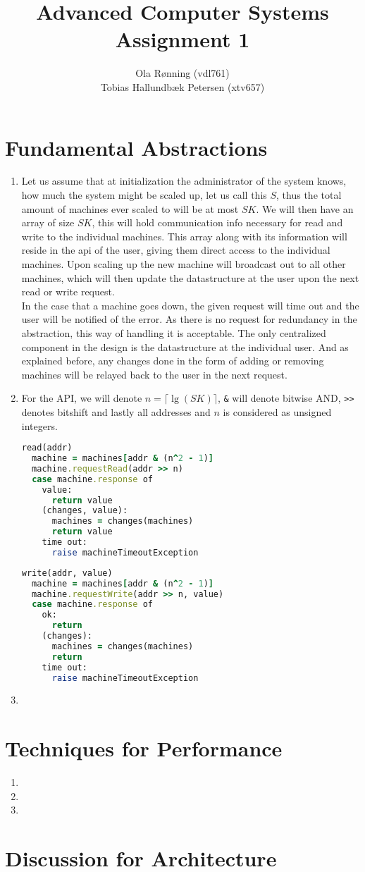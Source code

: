 \documentclass[a4paper]{article}
\author{Ola Rønning (vdl761) \\ Tobias Hallundbæk Petersen (xtv657)}
\title{Advanced Computer Systems \\ Assignment 1}
\begin{document}
\maketitle
\section{Fundamental Abstractions}
\begin{enumerate}
  \item Let us assume that at initialization the administrator of the system knows, how much the system might be scaled up, let us call this $S$, thus the total amount of machines ever scaled to will be at most $SK$. We will then have an array of size $SK$, this will hold communication info necessary for read and write to the individual machines. This array along with its information will reside in the api of the user, giving them direct access to the individual machines. Upon scaling up the new machine will broadcast out to all other machines, which will then update the datastructure at the user upon the next read or write request.\\
    In the case that a machine goes down, the given request will time out and the user will be notified of the error. As there is no request for redundancy in the abstraction, this way of handling it is acceptable.
    The only centralized component in the design is the datastructure at the individual user. And as explained before, any changes done in the form of adding or removing machines will be relayed back to the user in the next request.
  \item For the API, we will denote $n = \lceil \lg (SK) \rceil$, \texttt{\&} will denote bitwise AND, \texttt{>>} denotes bitshift and lastly all addresses and $n$ is considered as unsigned integers.\\
    \begin{lstlisting}[language=Ruby, caption={READ}]
read(addr)
  machine = machines[addr & (n^2 - 1)]
  machine.requestRead(addr >> n)
  case machine.response of
    value:
      return value
    (changes, value):
      machines = changes(machines)
      return value
    time out:
      raise machineTimeoutException
    \end{lstlisting}
    \begin{lstlisting}[language=Ruby, caption={WRITE}]
write(addr, value)
  machine = machines[addr & (n^2 - 1)]
  machine.requestWrite(addr >> n, value)
  case machine.response of
    ok:
      return
    (changes):
      machines = changes(machines)
      return
    time out:
      raise machineTimeoutException
    \end{lstlisting}
  \item

\end{enumerate}
\section{Techniques for Performance}
\begin{enumerate}
\item 
\item 
\item 
\end{enumerate}
\section{Discussion for Architecture}
\end{document}
